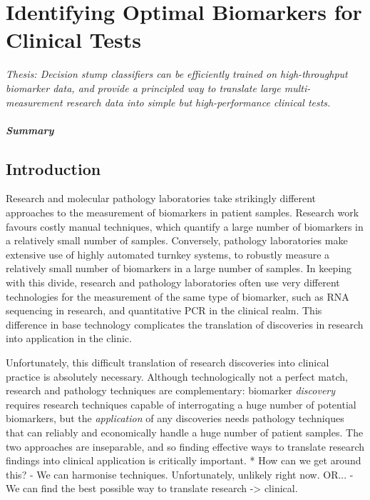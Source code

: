 \documentclass[dissertation.tex]{subfiles}
\begin{document}
\chapter{Identifying Optimal Biomarkers for Clinical Tests}
\label{chap:messina}


\emph{Thesis: Decision stump classifiers can be efficiently trained on high-throughput biomarker data, and provide a principled way to translate large multi-measurement research data into simple but high-performance clinical tests.}


\paragraph{Summary}


\section{Introduction}

Research and molecular pathology laboratories take strikingly different approaches to the measurement of biomarkers in patient samples.  Research work favours costly manual techniques, which quantify a large number of biomarkers in a relatively small number of samples.  Conversely, pathology laboratories make extensive use of highly automated turnkey systems, to robustly measure a relatively small number of biomarkers in a large number of samples.  In keeping with this divide, research and pathology laboratories often use very different technologies for the measurement of the same type of biomarker, such as RNA sequencing in research, and quantitative PCR in the clinical realm.  This difference in base technology complicates the translation of discoveries in research into application in the clinic.

Unfortunately, this difficult translation of research discoveries into clinical practice is absolutely necessary.  Although technologically not a perfect match, research and pathology techniques are complementary: biomarker \emph{discovery} requires research techniques capable of interrogating a huge number of potential biomarkers, but the \emph{application} of any discoveries needs pathology techniques that can reliably and economically handle a huge number of patient samples.  The two approaches are inseparable, and so finding effective ways to translate research findings into clinical application is critically important.  
* How can we get around this?
  - We can harmonise techniques.  Unfortunately, unlikely right now.
    OR...
  - We can find the best possible way to translate research -> clinical.
\end{document}
